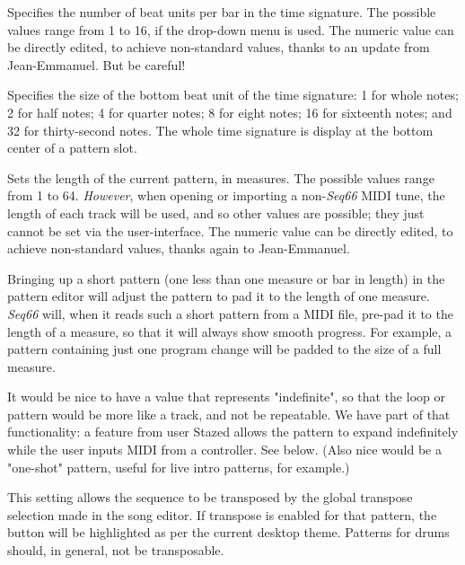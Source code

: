    Specifies the number of beat units per bar in the time signature.
   The possible values range from 1 to 16, if the drop-down menu is used.
   The numeric value can be directly edited, to achieve
   non-standard values, thanks to an update from Jean-Emmanuel.
   But be careful!

   Specifies the size of the bottom beat unit of the time signature:
   1 for whole notes; 2 for half notes; 4 for quarter notes; 8 for eight notes;
   16 for sixteenth notes; and 32 for thirty-second notes.
   The whole time signature is display at the bottom center of a pattern
   slot.

   Sets the length of the current pattern, in measures.
   The possible values range from 1 to 64.
   \textsl{However}, when opening or importing a non-\textsl{Seq66}
   MIDI tune, the length of each track will be used, and so other values
   are possible; they just cannot be set via the user-interface.
   The numeric value can be directly edited, to
   achieve non-standard values, thanks again to Jean-Emmanuel.

   Bringing up a short pattern (one less than one measure or bar in
   length) in the pattern editor will adjust the pattern to pad it to the
   length of one measure.
   \textsl{Seq66} will, when it reads such a short pattern
   from a MIDI file,
   pre-pad it to the length of a measure, so that it will always show smooth
   progress.
   For example, a pattern containing just one program
   change will be padded to the size of a full measure.

   It would be nice to have a value that represents
   "indefinite", so that the loop or pattern would be more like a track,
   and not be repeatable.  We have part of that functionality:
   a feature from user Stazed allows the pattern to expand
   indefinitely while the user inputs MIDI from a controller.
   See  below.
   (Also nice would be a "one-shot"
   pattern, useful for live intro patterns, for example.)

   This setting allows the sequence to be transposed by
   the global transpose selection made in the song editor.  If transpose is
   enabled for that pattern, the button will be highlighted as per the current
   desktop theme.  Patterns for drums should, in general, not be transposable.

